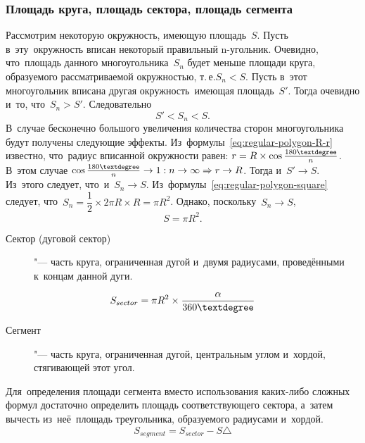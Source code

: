 \documentclass[]{scrartcl}
\begin{document}
\subsubsection{Площадь круга, площадь сектора, площадь сегмента}
Рассмотрим некоторую окружность, имеющую площадь~${\textstyle S}$. Пусть в~эту~окружность вписан некоторый правильный n-угольник. Очевидно, что~площадь данного многоугольника~${\textstyle S_{n}}$ будет меньше площади круга, образуемого рассматриваемой окружностью, т.\,е.${\textstyle S_{n}<S}$. Пусть в~этот многоугольник вписана другая окружность~имеющая площадь~${\textstyle S'}$. Тогда очевидно и~то, что~${\textstyle S_{n}>S'}$. Следовательно
\begin{equation}\label{eq:circle-square-1}
S'<S_n<S.
\end{equation}
В~случае бесконечно большого увеличения количества сторон многоугольника будут получены следующие эффекты. Из~формулы~\ref{eq:regular-polygon-R-r} известно, что~радиус вписанной окружности равен: ${\textstyle r = R \times \cos \frac{180 \textdegree}{n}}$. В~этом случае ${\textstyle \cos \frac{180 \textdegree}{n} \to 1: n \to \infty \Rightarrow r \to R}$. Тогда и~${\textstyle S' \to S}$. Из~этого следует, что~и~${\textstyle S_{n} \to S}$. Из~формулы~\ref{eq:regular-polygon-square} следует, что~${\textstyle S_{n} = \dfrac{1}{2} \times 2 \pi R \times R = \pi R^2}$. Однако, поскольку~${\textstyle S_{n} \to S}$,
\begin{equation}\label{eq:circle-square}
S = \pi R^{2}.
\end{equation}
\begin{description}
	\item[Сектор (дуговой сектор)] "--- часть круга, ограниченная дугой и~двумя радиусами, проведёнными к~концам данной дуги.
\end{description}
\begin{equation}\label{eq:circle-sector-square}
S_{sector} = \pi R^{2} \times \frac{\alpha}{360 \textdegree}
\end{equation}
\begin{description}
	\item[Сегмент] "--- часть круга, ограниченная дугой, центральным углом и~хордой, стягивающей этот угол.
\end{description}
Для~определения площади сегмента вместо использования каких-либо сложных формул достаточно определить площадь соответствующего сектора, а~затем вычесть из~неё~площадь треугольника, образуемого радиусами и~хордой.
\begin{equation}\label{eq:circle-segment-square}
S_{segment}=S_{sector} - S \triangle 
\end{equation}
\end{document}

